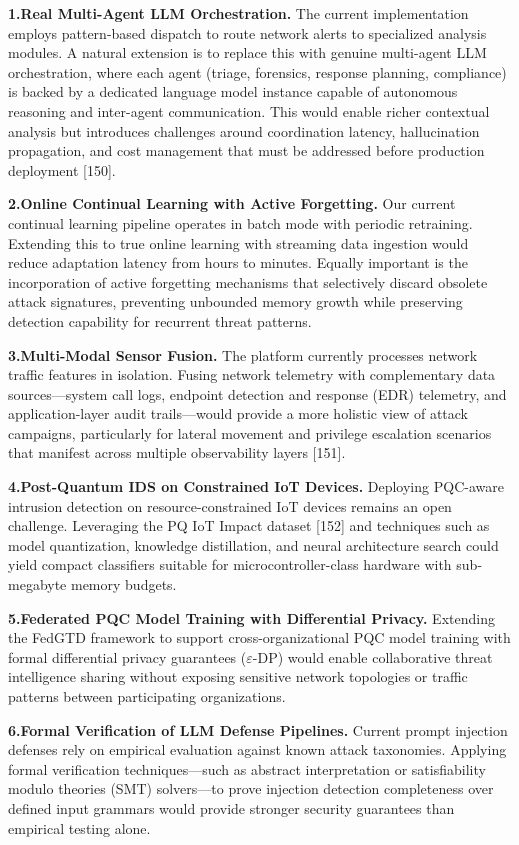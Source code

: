 \documentclass[12pt,a4paper]{article}
\begin{document}
\textbf{1.\;Real Multi-Agent LLM Orchestration.} The current implementation
employs pattern-based dispatch to route network alerts to specialized
analysis modules. A natural extension is to replace this with genuine
multi-agent LLM orchestration, where each agent (triage, forensics,
response planning, compliance) is backed by a dedicated language model
instance capable of autonomous reasoning and inter-agent communication.
This would enable richer contextual analysis but introduces challenges
around coordination latency, hallucination propagation, and cost management
that must be addressed before production deployment [150].

\textbf{2.\;Online Continual Learning with Active Forgetting.} Our current
continual learning pipeline operates in batch mode with periodic
retraining. Extending this to true online learning with streaming data
ingestion would reduce adaptation latency from hours to minutes. Equally
important is the incorporation of active forgetting mechanisms that
selectively discard obsolete attack signatures, preventing unbounded memory
growth while preserving detection capability for recurrent threat patterns.

\textbf{3.\;Multi-Modal Sensor Fusion.} The platform currently processes
network traffic features in isolation. Fusing network telemetry with
complementary data sources---system call logs, endpoint detection and
response (EDR) telemetry, and application-layer audit trails---would provide
a more holistic view of attack campaigns, particularly for lateral movement
and privilege escalation scenarios that manifest across multiple
observability layers [151].

\textbf{4.\;Post-Quantum IDS on Constrained IoT Devices.} Deploying
PQC-aware intrusion detection on resource-constrained IoT devices remains
an open challenge. Leveraging the PQ IoT Impact dataset [152] and
techniques such as model quantization, knowledge distillation, and
neural architecture search could yield compact classifiers suitable for
microcontroller-class hardware with sub-megabyte memory budgets.

\textbf{5.\;Federated PQC Model Training with Differential Privacy.}
Extending the FedGTD framework to support cross-organizational PQC model
training with formal differential privacy guarantees ($\varepsilon$-DP)
would enable collaborative threat intelligence sharing without exposing
sensitive network topologies or traffic patterns between participating
organizations.

\textbf{6.\;Formal Verification of LLM Defense Pipelines.} Current prompt
injection defenses rely on empirical evaluation against known attack
taxonomies. Applying formal verification techniques---such as abstract
interpretation or satisfiability modulo theories (SMT) solvers---to prove
injection detection completeness over defined input grammars would provide
stronger security guarantees than empirical testing alone.
\end{document}
